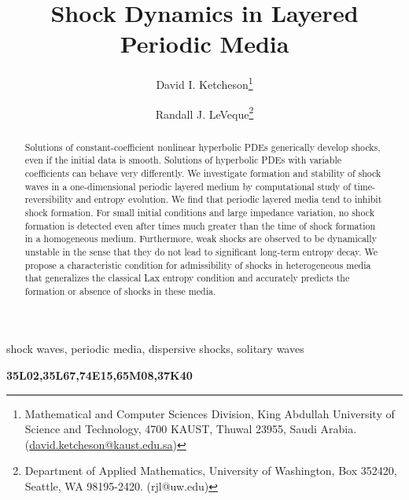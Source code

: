 \documentclass{cmslatex}
\begin{document}
\title{Shock Dynamics in Layered Periodic Media}

\author{%
  David I. Ketcheson\thanks{Mathematical and Computer Sciences Division, King Abdullah University of Science and
    Technology, 4700 KAUST, Thuwal 23955, Saudi Arabia.
   (\protect\url{david.ketcheson@kaust.edu.sa})} \and
    Randall J. LeVeque\thanks{Department of Applied Mathematics, University of Washington, Box 352420, Seattle, WA 98195-2420.
   (\mbox{rjl@uw.edu}) }}

\maketitle



\begin{abstract}
Solutions of constant-coefficient nonlinear hyperbolic PDEs generically 
develop shocks, even if the initial data is smooth.  Solutions of hyperbolic
PDEs with variable coefficients can behave very differently.
We investigate formation and stability of shock waves in a one-dimensional 
periodic layered medium by computational study of time-reversibility and entropy 
evolution.
We find that periodic layered media tend to inhibit shock formation.
For small initial conditions and large impedance variation, 
no shock formation is detected even
after times much greater than the time of shock formation in a homogeneous
medium.  Furthermore, weak shocks are observed to be dynamically unstable in
the sense that they do not lead to significant long-term entropy decay.
We propose a characteristic condition for admissibility of shocks in heterogeneous
media that generalizes the classical Lax entropy condition
and accurately predicts the formation or absence of shocks in these media.
\end{abstract}

\begin{keywords}
shock waves, periodic media, dispersive shocks, solitary waves
\smallskip

{\bf 35L02,35L67,74E15,65M08,37K40}
\end{keywords}


\pagestyle{myheadings}
\thispagestyle{plain}

\end{document}

